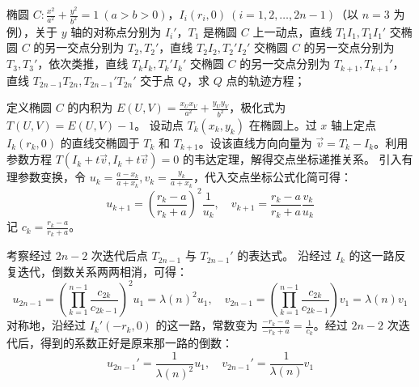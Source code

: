 \begin{exercise}
椭圆 \(C: \frac{x^2}{a^2} + \frac{y^2}{b^2} = 1\ (a > b > 0)\)，\(I_i(r_i,0)\ (i=1,2,\dots,2n-1)\)（以 \(n=3\) 为例），关于 \(y\) 轴的对称点分别为 \(I_i'\)，\(T_1\) 是椭圆 \(C\) 上一动点，直线 \(T_1I_1, T_1I_1'\) 交椭圆 \(C\) 的另一交点分别为 \(T_2, T_2'\)，直线 \(T_2I_2, T_2'I_2'\) 交椭圆 \(C\) 的另一交点分别为 \(T_3, T_3'\)，依次类推，直线 \(T_kI_k, T_k'I_k'\) 交椭圆 \(C\) 的另一交点分别为 \(T_{k+1}, T_{k+1}'\)，直线 \(T_{2n-1}T_{2n}, T_{2n-1}'T_{2n}'\) 交于点 \(Q\)，求 \(Q\) 点的轨迹方程；
\end{exercise}
\begin{solution}
定义椭圆 $C$ 的内积为 $E(U,V) = \frac{x_U x_V}{a^2} + \frac{y_U y_V}{b^2}$，极化式为 $T(U,V) = E(U,V) - 1$。
设动点 $T_k(x_k, y_k)$ 在椭圆上。过 $x$ 轴上定点 $I_k(r_k, 0)$ 的直线交椭圆于 $T_k$ 和 $T_{k+1}$。设该直线方向向量为 $\vec{v} = T_k - I_k$。利用参数方程 $T(I_k+t\vec{v}, I_k+t\vec{v}) = 0$ 的韦达定理，解得交点坐标递推关系。
引入有理参数变换，令 $u_k = \frac{a-x_k}{a+x_k}, v_k = \frac{y_k}{a+x_k}$，代入交点坐标公式化简可得：
$$ u_{k+1} = \left(\frac{r_k-a}{r_k+a}\right)^2 \frac{1}{u_k}, \quad v_{k+1} = \frac{r_k-a}{r_k+a} \frac{v_k}{u_k} $$
记 $c_k = \frac{r_k-a}{r_k+a}$。

考察经过 $2n-2$ 次迭代后点 $T_{2n-1}$ 与 $T_{2n-1}'$ 的表达式。
沿经过 $I_k$ 的这一路反复迭代，倒数关系两两相消，可得：
$$ u_{2n-1} = \left( \prod_{k=1}^{n-1} \frac{c_{2k}}{c_{2k-1}} \right)^2 u_1 = \lambda(n)^2 u_1, \quad v_{2n-1} = \left( \prod_{k=1}^{n-1} \frac{c_{2k}}{c_{2k-1}} \right) v_1 = \lambda(n) v_1 $$
对称地，沿经过 $I_k'(-r_k, 0)$ 的这一路，常数变为 $\frac{-r_k-a}{-r_k+a} = \frac{1}{c_k}$。经过 $2n-2$ 次迭代后，得到的系数正好是原来那一路的倒数：
$$ u_{2n-1}' = \frac{1}{\lambda(n)^2} u_1, \quad v_{2n-1}' = \frac{1}{\lambda(n)} v_1 $$


\end{solution}
